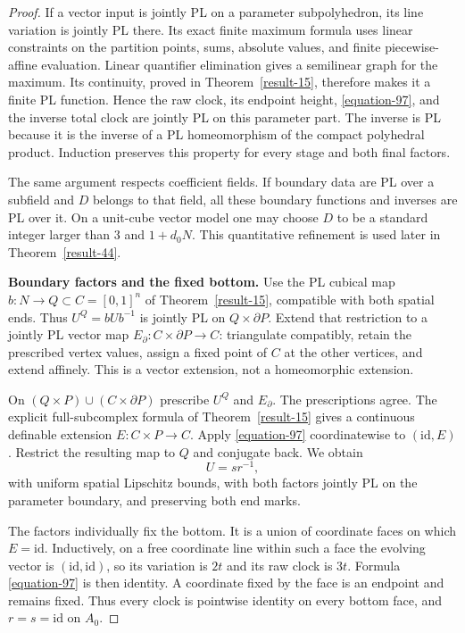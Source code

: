 \documentclass[11pt,a4paper]{article}
\theoremstyle{definition}
\begin{document}
\begin{proof}
If a vector input is jointly PL on a parameter subpolyhedron,
its line variation is jointly PL there. Its exact finite
maximum formula uses linear constraints on the partition
points, sums, absolute values, and finite piecewise-affine
evaluation. Linear quantifier elimination gives a semilinear
graph for the maximum. Its continuity, proved in Theorem~\ref{result-15},
therefore makes it a finite PL function. Hence the raw
clock, its endpoint height, \eqref{equation-97}, and the inverse total
clock are jointly PL on this parameter part. The inverse
is PL because it is the inverse of a PL homeomorphism of
the compact polyhedral product. Induction preserves this
property for every stage and both final factors.

The same argument respects coefficient fields. If boundary
data are PL over a subfield and $D$ belongs to that field,
all these boundary functions and inverses are PL over it.
On a unit-cube vector model one may choose $D$ to be a
standard integer larger than $3$ and $1+d_0N$.
This quantitative refinement is used later in Theorem~\ref{result-44}.

\textbf{Boundary factors and the fixed bottom.}\quad
Use the PL cubical map $b:N\to Q\subset C=[0,1]^n$
of Theorem~\ref{result-15}, compatible with both spatial ends. Thus
$U^Q=bUb^{-1}$ is jointly PL on $Q\times\partial P$.
Extend that restriction to a jointly PL vector map
$E_\partial:C\times\partial P\to C$: triangulate compatibly,
retain the prescribed vertex values, assign a fixed point
of $C$ at the other vertices, and extend affinely.
This is a vector extension, not a homeomorphic extension.

On $(Q\times P)\cup(C\times\partial P)$ prescribe $U^Q$
and $E_\partial$. The prescriptions agree. The explicit
full-subcomplex formula of Theorem~\ref{result-15} gives a continuous definable
extension $E:C\times P\to C$. Apply \eqref{equation-97} coordinatewise
to $(\mathrm{id},E)$. Restrict the resulting map to $Q$
and conjugate back. We obtain
\begin{equation}
 U=s r^{-1},
 \label{equation-99}
\end{equation}
with uniform spatial Lipschitz bounds, with both factors
jointly PL on the parameter boundary, and preserving both
end marks.

The factors individually fix the bottom. It is a union
of coordinate faces on which $E=\mathrm{id}$. Inductively,
on a free coordinate line within such a face the evolving
vector is $(\mathrm{id},\mathrm{id})$, so its variation is
$2t$ and its raw clock is $3t$. Formula \eqref{equation-97} is then
identity. A coordinate fixed by the face is an endpoint
and remains fixed. Thus every clock is pointwise identity
on every bottom face, and $r=s=\mathrm{id}$ on $A_0$.


\end{proof}
\end{document}
